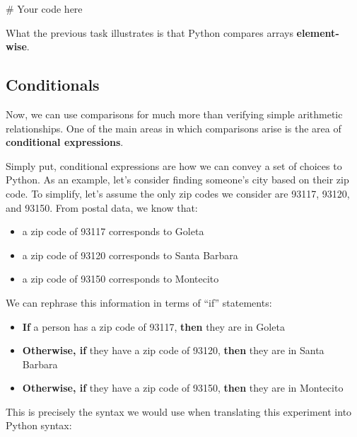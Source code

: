 \documentclass[
  11pt,
]{article}
\newenvironment{Shaded}{\begin{snugshade}}{\end{snugshade}}
\newcommand{\CommentTok}[1]{\textcolor[rgb]{0.37,0.37,0.37}{#1}}
\providecommand{\tightlist}{%
  \setlength{\itemsep}{0pt}\setlength{\parskip}{0pt}}\usepackage{longtable,booktabs,array}
\begin{document}
\begin{Shaded}
\begin{Highlighting}[]
\CommentTok{\# Your code here}
\end{Highlighting}
\end{Shaded}

What the previous task illustrates is that Python compares arrays
\textbf{element-wise}.

\subsection{Conditionals}\label{conditionals}

Now, we can use comparisons for much more than verifying simple
arithmetic relationships. One of the main areas in which comparisons
arise is the area of \textbf{conditional expressions}.

Simply put, conditional expressions are how we can convey a set of
choices to Python. As an example, let's consider finding someone's city
based on their zip code. To simplify, let's assume the only zip codes we
consider are 93117, 93120, and 93150. From postal data, we know that:

\begin{itemize}
\tightlist
\item
  a zip code of 93117 corresponds to Goleta
\item
  a zip code of 93120 corresponds to Santa Barbara\\
\item
  a zip code of 93150 corresponds to Montecito
\end{itemize}

We can rephrase this information in terms of ``if'' statements:

\begin{itemize}
\tightlist
\item
  \textbf{If} a person has a zip code of 93117, \textbf{then} they are
  in Goleta
\item
  \textbf{Otherwise, if} they have a zip code of 93120, \textbf{then}
  they are in Santa Barbara
\item
  \textbf{Otherwise, if} they have a zip code of 93150, \textbf{then}
  they are in Montecito
\end{itemize}

This is precisely the syntax we would use when translating this
experiment into Python syntax:
\end{document}
